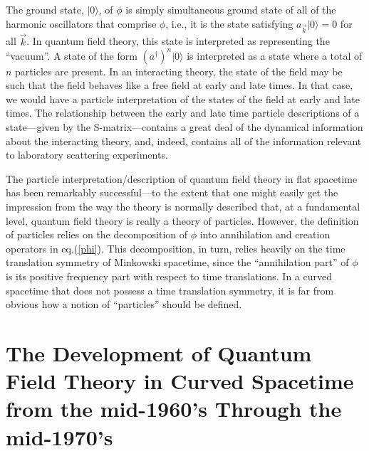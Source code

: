 The ground state, $|0 \rangle$, of $\phi$ is simply simultaneous ground state of all
of the harmonic oscillators that comprise $\phi$, i.e., it is the
state satisfying $a_{\vec{k}} |0 \rangle= 0$ for all $\vec{k}$. In quantum
field theory, this state is interpreted as representing the
``vacuum''. A state of the form $(a^\dagger)^n |0 \rangle$ is interpreted as
a state where a total of $n$ particles are present. In an interacting
theory, the state of the field may be such that the field behaves like
a free field at early and late times. In that case, we would have a
particle interpretation of the states of the field at early and late
times. The relationship between the early and late time particle
descriptions of a state---given by the S-matrix---contains a great
deal of the dynamical information about the interacting theory, and,
indeed, contains all of the information relevant to laboratory
scattering experiments.

The particle interpretation/description of quantum field theory in
flat spacetime has been remarkably successful---to the extent that one
might easily get the impression from the way the theory is normally
described that, at a fundamental level, quantum field theory is really
a theory of particles. However, the definition of particles relies on
the decomposition of $\phi$ into annihilation and creation operators
in eq.(\ref{phi}). This decomposition, in turn, relies heavily on the
time translation symmetry of Minkowski spacetime, since the
``annihilation part'' of $\phi$ is its positive frequency part with
respect to time translations. In a curved spacetime that does not
possess a time translation symmetry, it is far from obvious how a
notion of ``particles'' should be defined.


\section{The Development of Quantum Field Theory in Curved Spacetime 
from the mid-1960's Through the mid-1970's}

